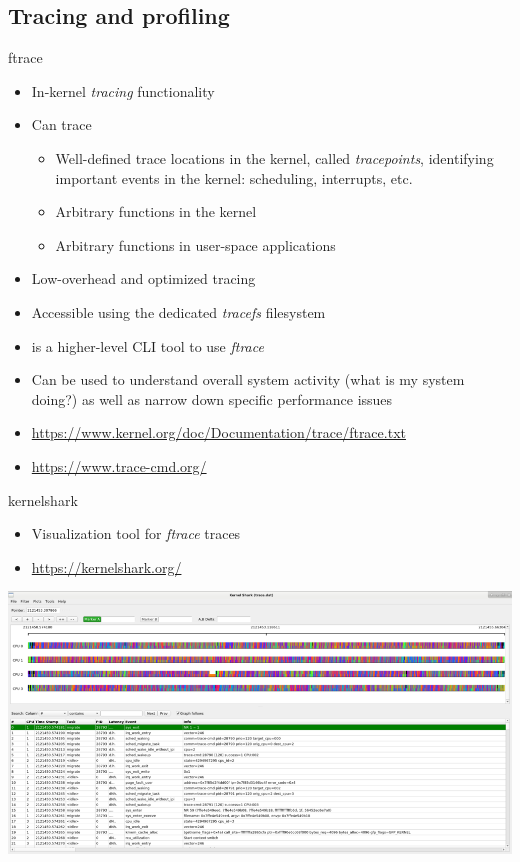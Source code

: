 

\subsection{Tracing and profiling}




\begin{frame}{ftrace}
  \begin{itemize}
  \item In-kernel {\em tracing} functionality
  \item Can trace
    \begin{itemize}
    \item Well-defined trace locations in the kernel, called {\em
        tracepoints}, identifying important events in the kernel:
      scheduling, interrupts, etc.
    \item Arbitrary functions in the kernel
    \item Arbitrary functions in user-space applications
    \end{itemize}
  \item Low-overhead and optimized tracing
  \item Accessible using the dedicated {\em tracefs} filesystem
  \item {} is a higher-level CLI tool to use {\em
      ftrace}
  \item Can be used to understand overall system activity (what is my
    system doing?) as well as narrow down specific performance
    issues
  \item \url{https://www.kernel.org/doc/Documentation/trace/ftrace.txt}
  \item \url{https://www.trace-cmd.org/}
  \end{itemize}
\end{frame}

\begin{frame}{kernelshark}
  \begin{itemize}
  \item Visualization tool for {\em ftrace} traces
  \item \url{https://kernelshark.org/}
  \end{itemize}
  \begin{center}
    \includegraphics[height=0.6\textheight]{slides/sysdev-application-development/kernelshark.png}
  \end{center}
\end{frame}

